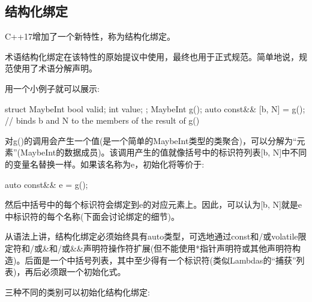 \subsection{结构化绑定}

C++17增加了一个新特性，称为结构化绑定。

\begin{notice}术语结构化绑定在该特性的原始提议中使用，最终也用于正式规范。简单地说，规范使用了术语分解声明。
\end{notice}

用一个小例子就可以展示:

\begin{cpp}
struct MaybeInt { bool valid; int value; };
MaybeInt g();
auto const&& [b, N] = g(); // binds b and N to the members of the result of g()
\end{cpp}

对g()的调用会产生一个值(是一个简单的MaybeInt类型的类聚合)，可以分解为“元素”(MaybeInt的数据成员)。该调用产生的值就像括号中的标识符列表[b, N]中不同的变量名替换一样。如果该名称为e，初始化将等价于:

\begin{cpp}
auto const&& e = g();
\end{cpp}

然后中括号中的每个标识符会绑定到e的对应元素上。因此，可以认为[b, N]就是e中标识符的每个名称(下面会讨论绑定的细节)。

从语法上讲，结构化绑定必须始终具有auto类型，可选地通过const和/或volatile限定符和/或\&和/或\&\&声明符操作符扩展(但不能使用*指针声明符或其他声明符构造)。后面是一个中括号列表，其中至少得有一个标识符(类似Lambdas的“捕获”列表)，再后必须跟一个初始化式。

三种不同的类别可以初始化结构化绑定:

